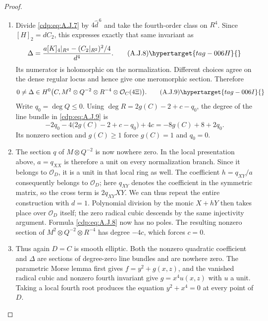 \begin{proof}
\begin{enumerate}[label=\arabic*.,leftmargin=*]
\item Divide \eqref{cdp:eq:A.J.7} by $4\widehat d^{\,6}$ and take the
fourth-order class on $R^4$. Since
$[H]_2=dC_2$, this expresses exactly that same invariant as
\[
 \Delta=
 \frac{a[K]_4|_{R^4}-(C_2|_{R^2})^2/4}{d^4}.
                                                        \tag{A.J.8}\hypertarget{tag-006H}{}\label{cdp:eq:A.J.8}
\]
Its numerator is holomorphic on the normalization.
Different choices agree on the dense regular locus and hence
give one meromorphic section. Therefore
\[
 0\ne\Delta\in H^0\bigl(C,M^2\otimes Q^{-2}
                    \otimes R^{-4}\otimes\mathcal O_C(4\Xi)\bigr).
                                                        \tag{A.J.9}\hypertarget{tag-006I}{}\label{cdp:eq:A.J.9}
\]
Write $q_0=\deg Q\leq0$. Using
$\deg R=2g(C)-2+c-q_0$, the degree of the line bundle
in \eqref{cdp:eq:A.J.9} is
\[
 -2q_0-4\bigl(2g(C)-2+c-q_0\bigr)+4c
       =-8g(C)+8+2q_0.
\]
Its nonzero section and $g(C)\geq1$ force
$g(C)=1$ and $q_0=0$.

\item The section $q$ of $M\otimes Q^{-2}$ is now nowhere zero.
In the local presentation above, $a=q_{XX}$ is therefore a
unit on every normalization branch. Since it belongs to
$\mathcal O_D$, it is a unit in that local ring as well.
The coefficient $h=q_{XY}/a$ consequently belongs to
$\mathcal O_D$; here $q_{XY}$ denotes the coefficient in
the symmetric matrix, so the cross term is $2q_{XY}XY$.
We can thus repeat the entire construction with $d=1$.
Polynomial division by the monic $X+hY$ then takes place
over $\mathcal O_D$ itself; the zero radical cubic descends
by the same injectivity argument. Formula \eqref{cdp:eq:A.J.8} now has
no poles. The resulting nonzero section of
$M^2\otimes Q^{-2}\otimes R^{-4}$ has degree $-4c$,
which forces $c=0$.

\item Thus again $D=C$ is smooth elliptic. Both the nonzero
quadratic coefficient and $\Delta$ are sections of
degree-zero line bundles and are nowhere zero. The parametric
Morse lemma first gives $f=y^2+g(x,z)$, and the vanished
radical cubic and nonzero fourth invariant give
$g=x^4u(x,z)$ with $u$ a unit. Taking a local fourth root
produces the equation $y^2+x^4=0$ at every point of $D$.


\end{enumerate}
\end{proof}
